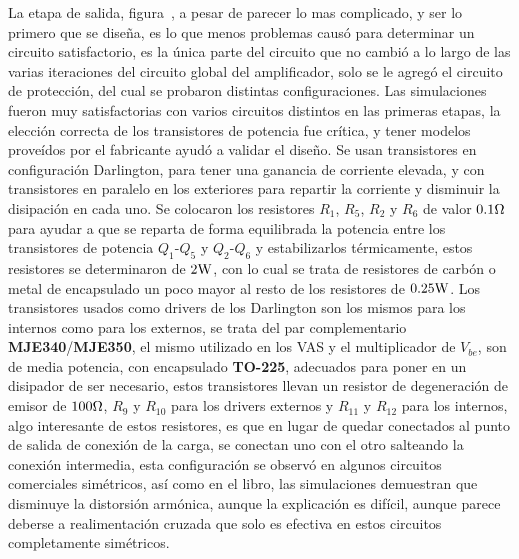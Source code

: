 La etapa de salida, figura~, a pesar de parecer lo mas complicado, y ser lo primero que se diseña, es lo que menos problemas causó para determinar un circuito satisfactorio, es la única parte del circuito que no cambió a lo largo de las varias iteraciones del circuito global del amplificador, solo se le agregó el circuito de protección, del cual se probaron distintas configuraciones. Las simulaciones fueron muy satisfactorias con varios circuitos distintos en las primeras etapas, la elección correcta de los transistores de potencia fue crítica, y tener modelos proveídos por el fabricante ayudó a validar el diseño.
Se usan transistores en configuración Darlington, para tener una ganancia de corriente elevada, y con transistores en paralelo en los exteriores para repartir la corriente y disminuir la disipación en cada uno. Se colocaron los resistores $R_{1}$, $R_{5}$, $R_{2}$ y $R_{6}$ de valor $0.1 \si[per-mode=symbol]{\ohm}$ para ayudar a que se reparta de forma equilibrada la potencia entre los transistores de potencia $Q_{1}$-$Q_{5}$ y $Q_{2}$-$Q_{6}$ y estabilizarlos térmicamente, estos resistores se determinaron de $2\si[per-mode=symbol]{\watt}$, con lo cual se trata de resistores de carbón o metal de encapsulado un poco mayor al resto de los resistores de $0.25\si[per-mode=symbol]{\watt}$. Los transistores usados como drivers de los Darlington son los mismos para los internos como para los externos, se trata del par complementario \textbf{MJE340}/\textbf{MJE350}, el mismo utilizado en los VAS y el multiplicador de $V_{be}$, son de media potencia, con encapsulado \textbf{TO-225}, adecuados para poner en un disipador de ser necesario, estos transistores llevan un resistor de degeneración de emisor de $100 \si[per-mode=symbol]{\ohm}$, $R_{9}$ y $R_{10}$ para los drivers externos y $R_{11}$ y $R_{12}$ para los internos, algo interesante de estos resistores, es que en lugar de quedar conectados al punto de salida de conexión de la carga, se conectan uno con el otro salteando la conexión intermedia, esta configuración se observó en algunos circuitos comerciales simétricos, así como en el libro, las simulaciones demuestran que disminuye la distorsión armónica, aunque la explicación es difícil, aunque parece deberse a realimentación cruzada que solo es efectiva en estos circuitos completamente simétricos. 
